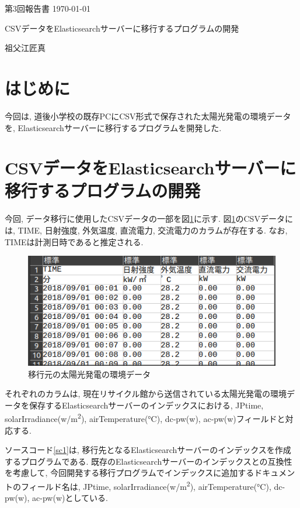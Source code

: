 \documentclass[a4j,12pt,]{jarticle}
\begin{document}
{\noindent\small 第3回報告書 \hfill\today}
\begin{center}
  {\Large CSVデータをElasticsearchサーバーに移行するプログラムの開発}
\end{center}
\begin{flushright}
  祖父江匠真 \\
\end{flushright}

\section{はじめに}
今回は, 道後小学校の既存PCにCSV形式で保存された太陽光発電の環境データ \cite{1}を, Elasticsearchサーバーに移行するプログラムを開発した.

\section{CSVデータをElasticsearchサーバーに移行するプログラムの開発}
今回, データ移行に使用したCSVデータの一部を図\ref{p1}に示す.
図\ref{p1}のCSVデータには, TIME, 日射強度, 外気温度, 直流電力, 交流電力のカラムが存在する.
なお, TIMEは計測日時であると推定される.

\begin{figure}[H]
  \begin{center}
    \includegraphics[width=160mm]{csv.png}
    \caption{移行元の太陽光発電の環境データ}
    \label{p1}
  \end{center}
\end{figure}

それぞれのカラムは, 現在リサイクル館から送信されている太陽光発電の環境データを保存するElasticsearchサーバーのインデックスにおける, JPtime, solarIrradiance(\si{\kilo}w/\si{\metre\squared}), airTemperature(\si{\degreeCelsius}), dc-pw(\si{\kilo}w), ac-pw(\si{\kilo}w)フィールドと対応する.

ソースコード\ref{sc1}は, 移行先となるElasticsearchサーバーのインデックスを作成するプログラムである.
既存のElasticsearchサーバーのインデックスとの互換性を考慮して, 今回開発する移行プログラムでインデックスに追加するドキュメントのフィールド名は, JPtime, solarIrradiance(\si{\kilo}w/\si{\metre\squared}), airTemperature(\si{\degreeCelsius}), dc-pw(\si{\kilo}w), ac-pw(\si{\kilo}w)としている.
\end{document}
